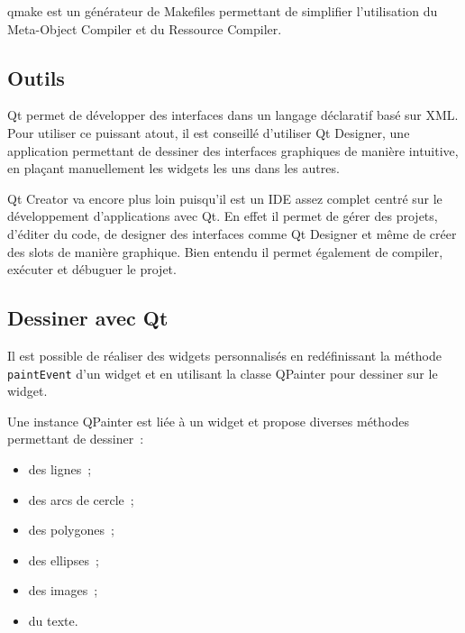 qmake est un générateur de Makefiles permettant de simplifier l'utilisation du Meta-Object Compiler et du Ressource Compiler.

\subsection{Outils}

Qt permet de développer des interfaces dans un langage déclaratif basé sur XML. Pour utiliser ce puissant atout, il est conseillé d'utiliser Qt Designer, une application permettant de dessiner des interfaces graphiques de manière intuitive, en plaçant manuellement les widgets les uns dans les autres.

Qt Creator va encore plus loin puisqu'il est un IDE assez complet centré sur le développement d'applications avec Qt. En effet il permet de gérer des projets, d'éditer du code, de designer des interfaces comme Qt Designer et même de créer des slots de manière graphique. Bien entendu il permet également de compiler, exécuter et débuguer le projet.

\subsection{Dessiner avec Qt}

Il est possible de réaliser des widgets personnalisés en redéfinissant la méthode \verb|paintEvent| d'un widget et en utilisant la classe QPainter pour dessiner sur le widget.

Une instance QPainter est liée à un widget et propose diverses méthodes permettant de dessiner~:
\begin{itemize}
	\item des lignes~;
	\item des arcs de cercle~;
	\item des polygones~;
	\item des ellipses~;
	\item des images~;
	\item du texte.
\end{itemize}

